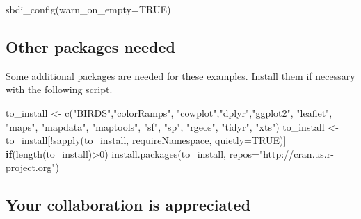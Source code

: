 \documentclass[
  10pt,
]{article}
\newenvironment{Shaded}{\begin{snugshade}}{\end{snugshade}}
\newcommand{\AttributeTok}[1]{\textcolor[rgb]{0.77,0.63,0.00}{#1}}
\newcommand{\ConstantTok}[1]{\textcolor[rgb]{0.00,0.00,0.00}{#1}}
\newcommand{\ControlFlowTok}[1]{\textcolor[rgb]{0.13,0.29,0.53}{\textbf{#1}}}
\newcommand{\DecValTok}[1]{\textcolor[rgb]{0.00,0.00,0.81}{#1}}
\newcommand{\FunctionTok}[1]{\textcolor[rgb]{0.00,0.00,0.00}{#1}}
\newcommand{\NormalTok}[1]{#1}
\newcommand{\OtherTok}[1]{\textcolor[rgb]{0.56,0.35,0.01}{#1}}
\newcommand{\SpecialCharTok}[1]{\textcolor[rgb]{0.00,0.00,0.00}{#1}}
\newcommand{\StringTok}[1]{\textcolor[rgb]{0.31,0.60,0.02}{#1}}
\begin{document}
\begin{Shaded}
\begin{Highlighting}[]
\FunctionTok{sbdi\_config}\NormalTok{(}\AttributeTok{warn\_on\_empty=}\ConstantTok{TRUE}\NormalTok{)}
\end{Highlighting}
\end{Shaded}

\hypertarget{other-packages-needed}{%
\subsection*{Other packages needed}\label{other-packages-needed}}

Some additional packages are needed for these examples. Install them if necessary with the following script.

\begin{Shaded}
\begin{Highlighting}[]
\NormalTok{to\_install }\OtherTok{\textless{}{-}} \FunctionTok{c}\NormalTok{(}\StringTok{"BIRDS"}\NormalTok{,}\StringTok{"colorRamps"}\NormalTok{, }\StringTok{"cowplot"}\NormalTok{,}\StringTok{"dplyr"}\NormalTok{,}\StringTok{"ggplot2"}\NormalTok{, }
                \StringTok{"leaflet"}\NormalTok{, }\StringTok{"maps"}\NormalTok{, }\StringTok{"mapdata"}\NormalTok{, }\StringTok{"maptools"}\NormalTok{, }\StringTok{"sf"}\NormalTok{, }\StringTok{"sp"}\NormalTok{,}
                \StringTok{"rgeos"}\NormalTok{, }\StringTok{"tidyr"}\NormalTok{, }\StringTok{"xts"}\NormalTok{)}
\NormalTok{to\_install }\OtherTok{\textless{}{-}}\NormalTok{ to\_install[}\SpecialCharTok{!}\FunctionTok{sapply}\NormalTok{(to\_install, }
\NormalTok{                                 requireNamespace, }
                                 \AttributeTok{quietly=}\ConstantTok{TRUE}\NormalTok{)]}
\ControlFlowTok{if}\NormalTok{(}\FunctionTok{length}\NormalTok{(to\_install)}\SpecialCharTok{\textgreater{}}\DecValTok{0}\NormalTok{)}
    \FunctionTok{install.packages}\NormalTok{(to\_install, }
                     \AttributeTok{repos=}\StringTok{"http://cran.us.r{-}project.org"}\NormalTok{)}
\end{Highlighting}
\end{Shaded}

\hypertarget{your-collaboration-is-appreciated}{%
\subsection*{Your collaboration is appreciated}\label{your-collaboration-is-appreciated}}
\end{document}
